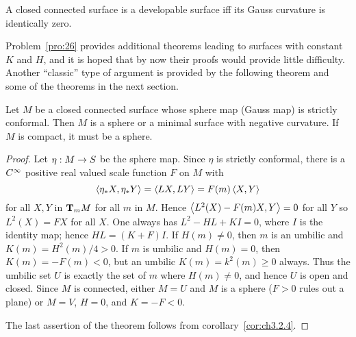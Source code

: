 \documentclass[../main]{subfiles}
\begin{document}
\begin{corollary} \label{cor:ch3.2.7}
A closed connected surface is a developable surface iff its Gauss curvature is identically zero.
\end{corollary}



Problem~\ref{pro:26} provides additional theorems leading to surfaces with constant $K$ and $H$, and it is hoped that by now their proofs would provide little difficulty. Another ``classic'' type of argument is provided by the following theorem and some of the theorems in the next section.



\begin{theorem} \label{thm:ch3.2.8}
Let $M$ be a closed connected surface whose sphere map (Gauss map) is strictly conformal. Then $M$ is a sphere or a minimal surface with negative curvature. If $M$ is compact, it must be a sphere.
\end{theorem}

\begin{proof}
Let $\eta : M \functionMaps S$ be the sphere map. Since $\eta$ is strictly conformal, there is a $\CInfty$ positive real valued scale function $F$ on $M$ with \[\ip {\eta_\ast X} {\eta_\ast Y} = \ip {LX} {LY} = F(m) \ip X Y\] for all $X, Y$ in $\tangentspace M m$ for all $m$ in $M$. Hence $\ip {L^2(X) - F(m) X} Y = 0$ for all $Y$ so $L^2(X) = FX$ for all $X$. One always has $L^2 - HL + KI = 0$, where $I$ is the identity map; hence $HL = (K + F)I$. If $H(m) \ne 0$, then $m$ is an umbilic and $K(m) = H^2(m)/4 > 0$. If $m$ is umbilic and $H(m) = 0$, then $K(m) = -F(m) < 0$, but an umbilic $K(m) = k^2(m) \ge 0$ always. Thus the umbilic set $U$ is exactly the set of $m$ where $H(m) \ne 0$, and hence $U$ is open and closed. Since $M$ is connected, either $M = U$ and $M$ is a sphere ($F > 0$ rules out a plane) or $M = V$, $H = 0$, and $K = -F < 0$. 

The last assertion of the theorem follows from corollary~\ref{cor:ch3.2.4}.
\end{proof}
\end{document}

